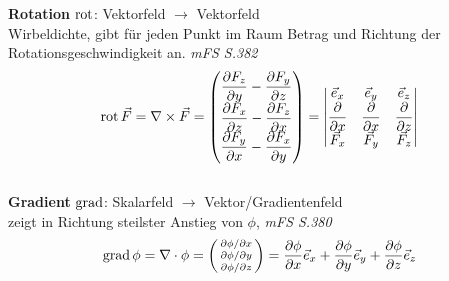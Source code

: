 \textbf{Rotation} $\operatorname{rot}$: Vektorfeld $\rightarrow$ Vektorfeld\\ 
\small{Wirbeldichte, gibt für jeden Punkt im Raum Betrag und Richtung der Rotationsgeschwindigkeit an. \textit{mFS S.382}}
\begin{align*}
\operatorname{rot} \vec{F} = \nabla \times \vec{F} = 
\begin{pmatrix}
    \dfrac{\partial F_z}{\partial y} - \dfrac{\partial F_y}{\partial z} \\
    \dfrac{\partial F_x}{\partial z} - \dfrac{\partial F_z}{\partial x} \\
    \dfrac{\partial F_y}{\partial x} - \dfrac{\partial F_x}{\partial y}
\end{pmatrix} =
\begin{vmatrix}
    \vec{e}_x & \vec{e}_y & \vec{e}_z \\
    \dfrac{\partial}{\partial x} & \dfrac{\partial }{\partial x} & \dfrac{\partial }{\partial z} \\
    \vec{F}_x & \vec{F}_y & \vec{F}_z
\end{vmatrix}
\end{align*}\\

\textbf{Gradient} $\operatorname{grad}$: Skalarfeld $\rightarrow$ Vektor/Gradientenfeld\\ 
\small{zeigt in Richtung steilster Anstieg von $\phi$, \textit{mFS S.380}}
\begin{align*}                                                                                          
    \operatorname{grad} \phi = \nabla \cdot \phi =  
    \begin{psmallmatrix}
        \partial \phi / \partial x \\
        \partial \phi / \partial y \\
        \partial \phi / \partial z
    \end{psmallmatrix}
    = \dfrac{\partial \phi}{\partial x} \vec{e}_x + \dfrac{\partial \phi}{\partial y} \vec{e}_y + 
    \dfrac{\partial \phi}{\partial z} \vec{e}_z  
\end{align*}

